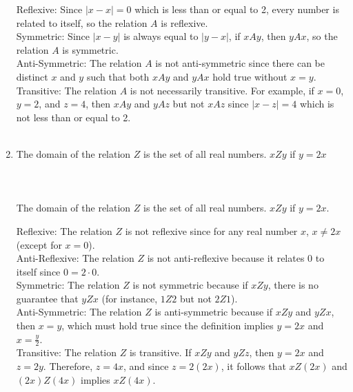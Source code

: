 \documentclass{amsart}
\theoremstyle{definition}
\theoremstyle{Exercise}
\theoremstyle{remark}
\theoremstyle{rule}
\numberwithin{equation}{section}
\begin{document}
\begin{enumerate}[label=(\alph*)]
Reflexive: Since \( |x-x| = 0 \) which is less than or equal to 2, every number is related to itself, so the relation \( A \) is reflexive.\\
Symmetric: Since \( |x-y| \) is always equal to \( |y-x| \), if \( xAy \), then \( yAx \), so the relation \( A \) is symmetric.\\
Anti-Symmetric: The relation \( A \) is not anti-symmetric since there can be distinct \( x \) and \( y \) such that both \( xAy \) and \( yAx \) hold true without \( x = y \).\\
Transitive: The relation \( A \) is not necessarily transitive. For example, if \( x = 0 \), \( y = 2 \), and \( z = 4 \), then \( xAy \) and \( yAz \) but not \( xAz \) since \( |x-z| = 4 \) which is not less than or equal to 2.
\\\\
\item The domain of the relation $Z$ is the set of all real numbers. $xZy$ if $y=2x$\\\\\\\\
The domain of the relation \( Z \) is the set of all real numbers. \( xZy \) if \( y = 2x \).

Reflexive: The relation \( Z \) is not reflexive since for any real number \( x \), \( x \neq 2x \) (except for \( x = 0 \)).\\
Anti-Reflexive: The relation \( Z \) is not anti-reflexive because it relates \( 0 \) to itself since \( 0 = 2 \cdot 0 \).\\
Symmetric: The relation \( Z \) is not symmetric because if \( xZy \), there is no guarantee that \( yZx \) (for instance, \( 1Z2 \) but not \( 2Z1 \)).\\
Anti-Symmetric: The relation \( Z \) is anti-symmetric because if \( xZy \) and \( yZx \), then \( x = y \), which must hold true since the definition implies \( y = 2x \) and \( x = \frac{y}{2} \).\\
Transitive: The relation \( Z \) is transitive. If \( xZy \) and \( yZz \), then \( y = 2x \) and \( z = 2y \). Therefore, \( z = 4x \), and since \( z = 2(2x) \), it follows that \( xZ(2x) \) and \( (2x)Z(4x) \) implies \( xZ(4x) \).
\\\\
\end{enumerate}
\newpage
\end{document}
